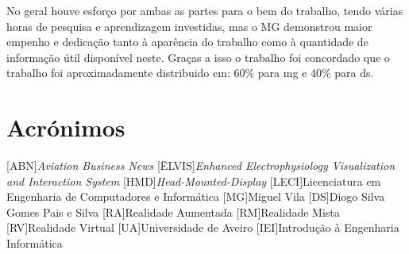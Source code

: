 \documentclass{report}
\begin{document}
No geral houve esforço por ambas as partes para o bem do trabalho, tendo várias horas de pesquisa e aprendizagem investidas, mas o MG demonstrou maior empenho e dedicação tanto à aparência do trabalho como à quantidade de informação útil disponível neste. Graças a isso o trabalho foi concordado que o trabalho foi aproximadamente distribuido em: 60\% para \ac{mg} e 40\% para \ac{ds}.



\chapter*{Acrónimos}
\begin{acronym}
[ABN]{\textit{Aviation Business News}}
[ĒLVIS]{\textit{Enhanced Electrophysiology Visualization and Interaction System}}
[HMD]{\textit{Head-Mounted-Display}}
[LECI]{Licenciatura em Engenharia de Computadores e Informática}
[MG]{Miguel Vila}
[DS]{Diogo Silva Gomes Pais e Silva}
[RA]{Realidade Aumentada}
[RM]{Realidade Mista}
[RV]{Realidade Virtual}
[UA]{Universidade de Aveiro}
[IEI]{Introdução à Engenharia Informática}
\end{acronym}

\printbibliography
\end{document}

